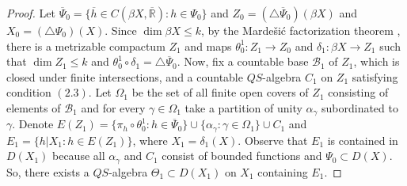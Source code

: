\documentclass[12pt]{amsart}
\begin{document}
\begin{proof}
Let $\overline\Psi_0=\{\overline h\in C(\beta X,\overline{\mathbb R}):h\in\Psi_0\}$ and $Z_0=(\triangle\overline\Psi_0)(\beta X)$ and $X_0=(\triangle \Psi_0)(X)$. 
 Since $\dim\beta X\leq k$, by the Marde\v{s}i\'{c} factorization theorem \cite[Theorem 3.4.1]{en}, there is a metrizable compactum $Z_1$ and maps $\theta^1_0:Z_1\to Z_0$ and $\delta_1:\beta X\to Z_1$ 
 such that $\dim Z_1\leq k$ and $\theta^1_0\circ\delta_1=\triangle\overline\Psi_0$. 
 Now, fix a countable base $\mathcal B_1$ of $Z_1$, which is closed under finite intersections, and a countable $QS$-algebra $C_1$ on $Z_1$ satisfying condition $(2.3)$. %
 Let $\Omega_1$ be the set of all finite open covers of $Z_1$ consisting of elements of $\mathcal B_1$ and for every $\gamma\in\Omega_1$ take a partition of unity $\alpha_\gamma$ subordinated to $\gamma$. 
 Denote $E(Z_1)=\{\pi_h\circ\theta^1_0:h\in\overline\Psi_0\}\cup\{\alpha_\gamma:\gamma\in\Omega_1\}\cup C_1$ and $E_1=\{h|X_1:h\in E(Z_1)\}$, where $X_1=\delta_1(X)$. 
 Observe that $E_1$ is contained in $D(X_1)$ because all $\alpha_\gamma$ and $C_1$ consist of bounded functions and $\Psi_0\subset D(X)$.
  So,  there exists a $QS$-algebra
  $\Theta_1\subset D(X_1)$ on $X_1$ containing $E_1$.
 

\end{proof}
\end{document}
